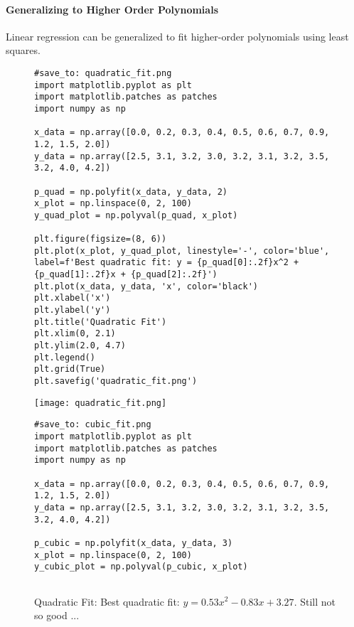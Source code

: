 \documentclass{article}
\begin{document}
\paragraph{Generalizing to Higher Order Polynomials}

Linear regression can be generalized to fit higher-order polynomials using least squares.

\begin{figure}[H]
    \centering
    \begin{minipage}{0.48\textwidth}
        \begin{verbatim}
#save_to: quadratic_fit.png
import matplotlib.pyplot as plt
import matplotlib.patches as patches
import numpy as np

x_data = np.array([0.0, 0.2, 0.3, 0.4, 0.5, 0.6, 0.7, 0.9, 1.2, 1.5, 2.0])
y_data = np.array([2.5, 3.1, 3.2, 3.0, 3.2, 3.1, 3.2, 3.5, 3.2, 4.0, 4.2])

p_quad = np.polyfit(x_data, y_data, 2)
x_plot = np.linspace(0, 2, 100)
y_quad_plot = np.polyval(p_quad, x_plot)

plt.figure(figsize=(8, 6))
plt.plot(x_plot, y_quad_plot, linestyle='-', color='blue', label=f'Best quadratic fit: y = {p_quad[0]:.2f}x^2 + {p_quad[1]:.2f}x + {p_quad[2]:.2f}')
plt.plot(x_data, y_data, 'x', color='black')
plt.xlabel('x')
plt.ylabel('y')
plt.title('Quadratic Fit')
plt.xlim(0, 2.1)
plt.ylim(2.0, 4.7)
plt.legend()
plt.grid(True)
plt.savefig('quadratic_fit.png')
        \end{verbatim}
        \texttt{[image: quadratic\_fit.png]}
        \caption{Quadratic Fit: Best quadratic fit: \(y = 0.53x^2 - 0.83x + 3.27\). Still not so good ...}
        \label{fig:quadratic_fit}
    \end{minipage}
    \hfill
    \begin{minipage}{0.48\textwidth}
        \begin{verbatim}
#save_to: cubic_fit.png
import matplotlib.pyplot as plt
import matplotlib.patches as patches
import numpy as np

x_data = np.array([0.0, 0.2, 0.3, 0.4, 0.5, 0.6, 0.7, 0.9, 1.2, 1.5, 2.0])
y_data = np.array([2.5, 3.1, 3.2, 3.0, 3.2, 3.1, 3.2, 3.5, 3.2, 4.0, 4.2])

p_cubic = np.polyfit(x_data, y_data, 3)
x_plot = np.linspace(0, 2, 100)
y_cubic_plot = np.polyval(p_cubic, x_plot)


\end{verbatim}
\end{minipage}
\end{figure}
\end{document}
